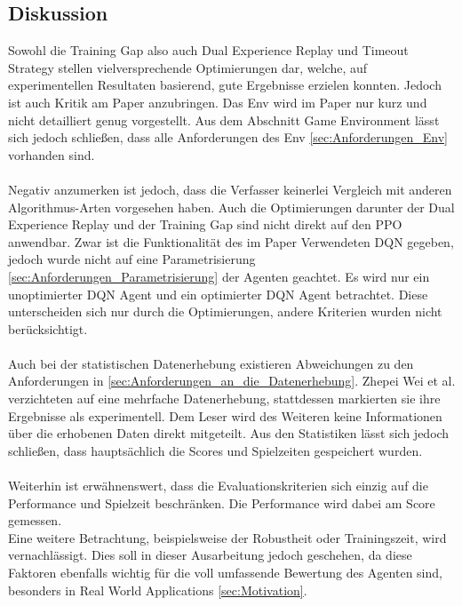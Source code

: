 \subsection{Diskussion} \label{sec:Paper_1_Diskussion}
Sowohl die Training Gap also auch Dual Experience Replay und Timeout Strategy stellen vielversprechende Optimierungen dar, welche, auf experimentellen Resultaten basierend, gute Ergebnisse erzielen konnten. Jedoch ist auch Kritik am Paper anzubringen.
Das Env wird im Paper nur kurz und nicht detailliert genug vorgestellt. Aus dem Abschnitt Game Environment lässt sich jedoch schließen, dass alle Anforderungen des Env \ref{sec:Anforderungen_Env} vorhanden sind.\\
\\ Negativ anzumerken ist jedoch, dass die Verfasser keinerlei Vergleich mit anderen Algorithmus-Arten vorgesehen haben. Auch die Optimierungen darunter der Dual Experience Replay und der Training Gap sind nicht direkt auf den PPO anwendbar. Zwar ist die Funktionalität des im Paper Verwendeten DQN gegeben, jedoch wurde nicht auf eine Parametrisierung \ref{sec:Anforderungen_Parametrisierung} der Agenten geachtet. Es wird nur ein unoptimierter DQN Agent und ein optimierter DQN Agent betrachtet. Diese unterscheiden sich nur durch die Optimierungen, andere Kriterien wurden nicht berücksichtigt.\\
\\Auch bei der statistischen Datenerhebung existieren Abweichungen zu den Anforderungen in \ref{sec:Anforderungen_an_die_Datenerhebung}. Zhepei Wei et al. verzichteten auf eine mehrfache Datenerhebung, stattdessen markierten sie ihre Ergebnisse als experimentell. Dem Leser wird des Weiteren keine Informationen über die erhobenen Daten direkt mitgeteilt. Aus den Statistiken lässt sich jedoch schließen, dass hauptsächlich die Scores und Spielzeiten gespeichert wurden.\\
\\ Weiterhin ist erwähnenswert, dass die Evaluationskriterien sich einzig auf die Performance und Spielzeit beschränken. Die Performance wird dabei am Score gemessen.\\
Eine weitere Betrachtung, beispielsweise der Robustheit oder Trainingszeit, wird vernachlässigt. Dies soll in dieser Ausarbeitung jedoch geschehen, da diese Faktoren ebenfalls wichtig für die voll umfassende Bewertung des Agenten sind, besonders in Real World Applications \ref{sec:Motivation}.


